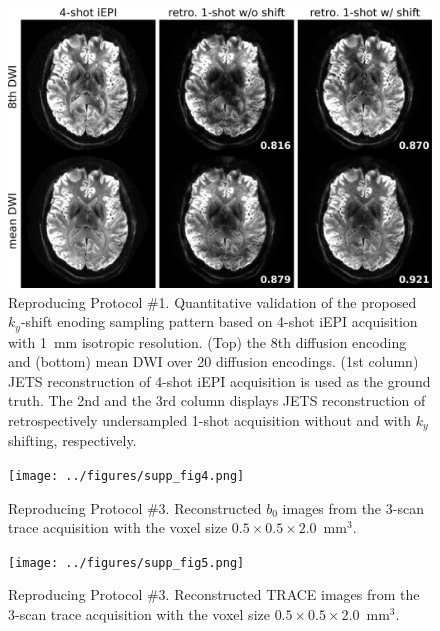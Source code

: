 \documentclass[a4paper,11pt,twoside]{report}
\begin{document}
    \begin{figure}[h]
        \includegraphics[width=\textwidth]{../figures/supp_fig2.png}
        \caption{Reproducing Protocol \#1.
        Quantitative validation of the proposed
        $k_y$-shift enoding sampling pattern
        based on 4-shot iEPI acquisition with 1~mm isotropic resolution.
        (Top) the 8th diffusion encoding and
        (bottom) mean DWI over 20 diffusion encodings.
        (1st column) JETS reconstruction of 4-shot iEPI acquisition
        is used as the ground truth.
        The 2nd and the 3rd column displays JETS reconstruction
        of retrospectively undersampled
        1-shot acquisition without and with $k_y$ shifting,
        respectively.}
    \end{figure}

    \begin{figure}[h]
        \texttt{[image: ../figures/supp\_fig4.png]}
        \caption{Reproducing Protocol \#3.
        Reconstructed $b_0$ images from the 3-scan trace acquisition with
        the voxel size $0.5\times0.5\times2.0$~mm$^3$.}
    \end{figure}

    \begin{figure}[h]
        \texttt{[image: ../figures/supp\_fig5.png]}
        \caption{Reproducing Protocol \#3.
        Reconstructed TRACE images from the 3-scan trace acquisition with
        the voxel size $0.5\times0.5\times2.0$~mm$^3$.}
    \end{figure}
\end{document}
